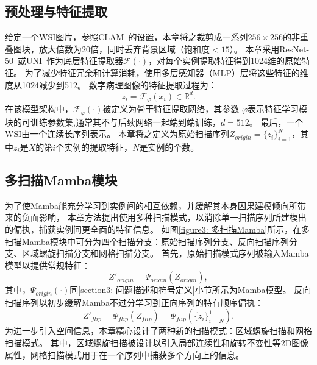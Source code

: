 \subsection[\hspace{-2pt}预处理与特征提取]{{\heiti{} \hspace{-8pt}预处理与特征提取}}\label{section3: 预处理与特征提取}

给定一个WSI图片，参照CLAM~\cite{lu2021data}的设置，本章将之裁剪成一系列$256\times256$的非重叠图块，放大倍数为$20$倍，同时丢弃背景区域（饱和度$< 15$）。
本章采用ResNet-50~\cite{ROYERCARFAGNI2001253}或UNI~\cite{chen2024towards}作为底层特征提取器$\mathcal{F}\left(\cdot\right)$，对每个实例提取特征得到1024维的原始特征。
为了减少特征冗余和计算消耗，使用多层感知器（MLP）层将这些特征的维度从1024减少到512。
数字病理图像的特征提取过程为：
\begin{equation}
  z_i= \mathcal{F}_\varphi(x_i) \in \mathbb{R} ^d.
\end{equation}
在该模型架构中，$\mathcal{F}_\varphi(\cdot)$被定义为骨干特征提取网络，其参数 $\varphi$表示特征学习模块的可训练参数集,通常其不与后续网络一起端到端训练，$d= 512$。
最后，一个WSI由一个连续长序列表示。
本章将之定义为原始扫描序列$Z_{origin}=\{z_i\}_{i=1}^N$，其中$z_i$是$X$的第$i$个实例的提取特征，$N$是实例的个数。

\subsection[\hspace{-2pt}多扫描Mamba模块]{{\heiti{} \hspace{-8pt}多扫描Mamba模块}}\label{section3: 多扫描Mamba模块}

为了使Mamba能充分学习到实例间的相互依赖，并缓解其本身因果建模倾向所带来的负面影响，
本章方法提出使用多种扫描模式，以消除单一扫描序列所建模出的偏执，捕获实例间更全面的特征信息。
如图\ref{figure3: 多扫描Mamba}所示，在多扫描Mamba模块中可分为四个扫描分支：原始扫描序列分支、反向扫描序列分支、区域螺旋扫描分支和网格扫描分支。
首先，原始扫描模式序列被输入Mamba模型以提供常规特征：
\begin{equation}
  Z'_{origin}=\Psi_{origin} (Z_{origin}),
\end{equation}
其中，$\Psi_{origin}(\cdot)$同\ref{section3: 问题描述和符号定义}小节所示为Mamba模型。 反向扫描序列以初步缓解Mamba不过分学习到正向序列的特有顺序偏执：
\begin{equation}
  Z'_{flip}=\Psi_{flip} (Z_{flip})=\Psi_{flip} (\{z_i\}_{i=N}^1).
\end{equation}
为进一步引入空间信息，本章精心设计了两种新的扫描模式：区域螺旋扫描和网格扫描模式。
其中，区域螺旋扫描被设计以引入局部连续性和旋转不变性等2D图像属性，网格扫描模式用于在一个序列中捕获多个方向上的信息。




